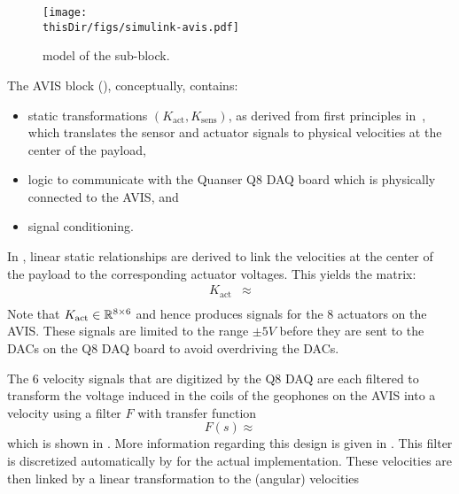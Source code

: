 \begin{figure}[p]
\setlength\figurewidth{\columnwidth}
  \texttt{[image: \\thisDir/figs/simulink-avis.pdf]}
  \caption{\Simulink model of the  sub-block.}
  \label{fig:avis:simulink:avis}
\end{figure}

The \gls{AVIS} block (), conceptually, contains:
\begin{itemize}
  \item static transformations $(K_{\mathrm{act}}, K_{\mathrm{sens}})$, as derived from first principles in~\citep{Rademakers2005MSc}, which translates the sensor and actuator signals to physical velocities at the center of the payload,
  \item logic to communicate with the Quanser Q8 \gls{DAQ} board which is physically connected to the \gls{AVIS}, and
  \item signal conditioning.
\end{itemize}

In \citet[Appendix A.4]{Rademakers2005MSc}, linear static relationships are derived to link the velocities at the center of the payload to the corresponding actuator voltages.
This yields the matrix:
\begin{align}
  K_{\mathrm{act}}    & \approx \\
\end{align}
Note that $K_{\mathrm{act}} \in \mathbb{R}^{8\times6}$ and hence produces signals for the $8$ actuators on the \gls{AVIS}.
These signals are limited to the range $\pm 5\unit{V}$ before they are sent to the \glspl{DAC} on the Q8 \gls{DAQ} board to avoid overdriving the \glspl{DAC}.

The $6$ velocity signals that are digitized by the Q8 \gls{DAQ} are each filtered to transform the voltage induced in the coils of the geophones on the \gls{AVIS} into a velocity using a filter $F$ with transfer function
\begin{equation}
  F(s) \approx 
\end{equation}
which is shown in .
More information regarding this design is given in \citep[Appendix A.3]{Rademakers2005MSc}.
This filter is discretized automatically by \Simulink for the actual implementation.
These velocities are then linked by a linear transformation to the (angular) velocities

